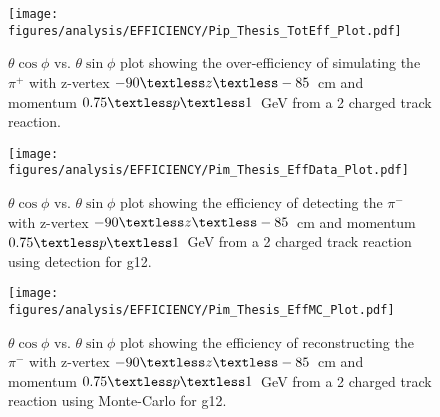 \begin{figure}[h!]\begin{center}
\texttt{[image: \\figures/analysis/EFFICIENCY/Pip\_Thesis\_TotEff\_Plot.pdf]}
\caption[$\theta \cos\phi$ vs. $\theta \sin\phi$ plot showing the over-efficiency of simulating the $\pi^+$ with z-vertex $-90\textless z\textless-85$~cm and momentum $0.75\textless p \textless 1$~GeV from a 2 charged track reaction]{\label{fig:toteff_pip} $\theta \cos\phi$ vs. $\theta \sin\phi$ plot showing the over-efficiency of simulating the $\pi^+$ with z-vertex $-90\textless z\textless-85$~cm and momentum $0.75\textless p \textless 1$~GeV from a 2 charged track reaction.}
\end{center}\end{figure}
\begin{figure}[h!]\begin{center}
\texttt{[image: \\figures/analysis/EFFICIENCY/Pim\_Thesis\_EffData\_Plot.pdf]}
\caption[$\theta \cos\phi$ vs. $\theta \sin\phi$ plot showing the efficiency of detecting the $\pi^-$ with z-vertex $-90\textless z\textless-85$~cm and momentum $0.75\textless p \textless 1$~GeV from a 2 charged track reaction using  detection for g12]{\label{fig:eff_pim_data} $\theta \cos\phi$ vs. $\theta \sin\phi$ plot showing the efficiency of detecting the $\pi^-$ with z-vertex $-90\textless z\textless-85$~cm and momentum $0.75\textless p \textless 1$~GeV from a 2 charged track reaction using  detection for g12.}
\end{center}\end{figure}
%
\begin{figure}[h!]\begin{center}
\texttt{[image: \\figures/analysis/EFFICIENCY/Pim\_Thesis\_EffMC\_Plot.pdf]}
\caption[$\theta \cos\phi$ vs. $\theta \sin\phi$ plot showing the efficiency of reconstructing the $\pi^-$ with z-vertex $-90\textless z\textless-85$~cm and momentum $0.75\textless p \textless 1$~GeV from a 2 charged track reaction using  Monte-Carlo for g12]{\label{fig:eff_pim_MC} $\theta \cos\phi$ vs. $\theta \sin\phi$ plot showing the efficiency of reconstructing the $\pi^-$ with z-vertex $-90\textless z\textless-85$~cm and momentum $0.75\textless p \textless 1$~GeV from a 2 charged track reaction using  Monte-Carlo for g12.}
\end{center}\end{figure}
%
